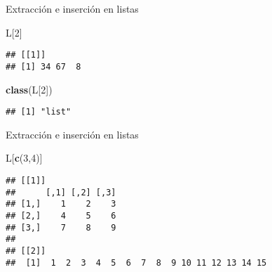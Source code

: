 \documentclass[ignorenonframetext,]{beamer}
\newenvironment{Shaded}{\begin{snugshade}}{\end{snugshade}}
\newcommand{\KeywordTok}[1]{\textcolor[rgb]{0.13,0.29,0.53}{\textbf{#1}}}
\newcommand{\DecValTok}[1]{\textcolor[rgb]{0.00,0.00,0.81}{#1}}
\newcommand{\NormalTok}[1]{#1}
\begin{document}
\begin{frame}[fragile]{Extracción e inserción en listas}

\begin{Shaded}
\begin{Highlighting}[]
\NormalTok{L[}\DecValTok{2}\NormalTok{]}
\end{Highlighting}
\end{Shaded}
\pause
\begin{verbatim}
## [[1]]
## [1] 34 67  8
\end{verbatim}

\begin{Shaded}
\begin{Highlighting}[]
\KeywordTok{class}\NormalTok{(L[}\DecValTok{2}\NormalTok{])}
\end{Highlighting}
\end{Shaded}
\pause
\begin{verbatim}
## [1] "list"
\end{verbatim}

\end{frame}

\begin{frame}[fragile]{Extracción e inserción en listas}

\begin{Shaded}
\begin{Highlighting}[]
\NormalTok{L[}\KeywordTok{c}\NormalTok{(}\DecValTok{3}\NormalTok{,}\DecValTok{4}\NormalTok{)]}
\end{Highlighting}
\end{Shaded}
\pause
\begin{verbatim}
## [[1]]
##      [,1] [,2] [,3]
## [1,]    1    2    3
## [2,]    4    5    6
## [3,]    7    8    9
## 
## [[2]]
##  [1]  1  2  3  4  5  6  7  8  9 10 11 12 13 14 15
\end{verbatim}

\end{frame}
\end{document}

